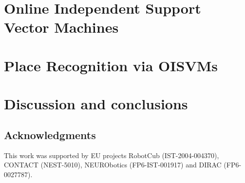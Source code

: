 \documentclass{bmvc}
\begin{document}
\section{Online Independent Support Vector Machines}
\label{sec:opt}


\section{Place Recognition via OISVMs}
\label{sec:exp}


\section{Discussion and conclusions}
\label{sec:concl}


\subsection*{Acknowledgments}
This work was supported by EU projects RobotCub (IST-2004-004370),
CONTACT (NEST-5010), NEURObotics (FP6-IST-001917) and DIRAC (FP6-0027787).


{\small


}
\end{document}
